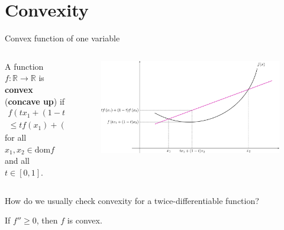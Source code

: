 \documentclass{beamer}
\begin{document}
\section{Convexity}
\begin{frame}{Convex function of one variable}
\begin{columns}
\begin{column}{.5\textwidth}
\begin{definition}
A function $f:\mathbb{R}\to\mathbb{R}$ is \textbf{convex} (\textbf{concave up}) if \pause
\begin{multline*}
f(tx_1+(1-t)x_2)\\\le tf(x_1)+(1-t)f(x_2)    
\end{multline*}
for all $x_1,x_2\in\mathrm{dom}f$ and all $t\in[0,1]$. 
\end{definition}
\end{column}
\begin{column}{.5\textwidth}
\begin{figure}
    \centering
    \includegraphics[width=\textwidth]{plots/conv_func.png}
\end{figure}
\end{column}
\end{columns}
\vfill

\pause How do we usually check convexity for a twice-differentiable function? \pause
\begin{theorem}
If $f''\ge0$, then $f$ is convex.
\end{theorem}
\end{frame}

\end{document}
